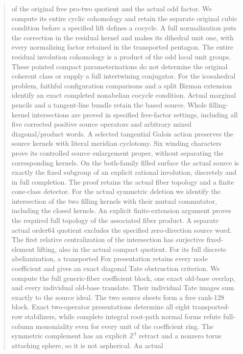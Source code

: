 \documentclass[11pt,a4paper]{article}
\begin{document}
\begin{abstract}
of the original free pro-two quotient and the actual odd factor.
We compute its entire cyclic cohomology and retain the separate
original cubic condition before a specified lift defines a cocycle.
A full normalization puts the correction in the residual kernel
and makes its dihedral unit one, with every normalizing factor
retained in the transported pentagon. The entire residual
involution cohomology is a product of the odd local unit groups.
These pointed compact parameterizations do not determine the
original coherent class or supply a full intertwining conjugator.
For the icosahedral problem, faithful configuration comparisons and a
split Birman extension identify an exact completed nonabelian cocycle
condition. Actual marginal pencils and a tangent-line bundle retain
the based source. Whole filling-kernel intersections are proved in
specified free-factor settings, including all five corrected positive
source operators and arbitrary mixed diagonal/product words. A selected
tangential Galois action preserves the source kernels with literal
meridian cyclotomy. Six winding characters prove its controlled source
enlargement proper, without separating the corresponding kernels.
On the both-family filled surface the actual source is exactly the
fixed subgroup of an explicit rational involution, discretely and in
full completion. The proof retains the actual fiber topology and a
finite cone-class detector. For the actual symmetric deletion we
identify the intersection of the two filling kernels with their mutual
commutator, including the closed kernels. An explicit finite-extension
argument proves the required full topology of the associated fiber
product. A separate actual order64 quotient excludes the specified
zero-direction source word. The first relative centralization of the
intersection has surjective fixed-element lifting, also in the actual
compact quotient. For its full discrete abelianization, a transported
Fox presentation retains every node coefficient and gives an exact
diagonal Tate obstruction criterion. We compute the full generic-fiber
coefficient block, one exact old-base overlap, and every individual
old-base translate. Their individual Tate images sum exactly to the
source ideal. The two source sheets form a free rank-128 block.
Exact two-operator presentations determine all eight transported-row
stabilizers, while complete integral root-path normal forms refute
full-column monomiality even for every unit of the coefficient ring.
The symmetric complement has an explicit $\mathbb Z^3$ retract and a
nonzero torus attaching sphere, so it is not aspherical. An actual

\end{abstract}
\end{document}
